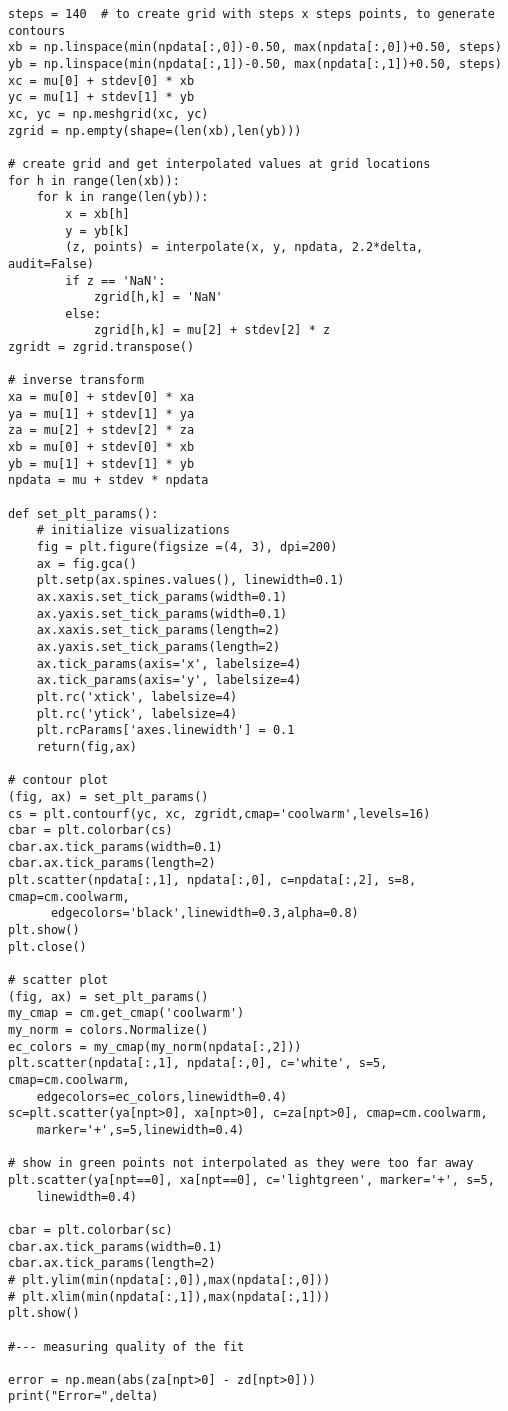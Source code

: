 \documentclass[oneside,10pt]{book}
\begin{document}
\begin{lstlisting}
steps = 140  # to create grid with steps x steps points, to generate contours
xb = np.linspace(min(npdata[:,0])-0.50, max(npdata[:,0])+0.50, steps)
yb = np.linspace(min(npdata[:,1])-0.50, max(npdata[:,1])+0.50, steps)
xc = mu[0] + stdev[0] * xb
yc = mu[1] + stdev[1] * yb
xc, yc = np.meshgrid(xc, yc)
zgrid = np.empty(shape=(len(xb),len(yb)))   

# create grid and get interpolated values at grid locations
for h in range(len(xb)):
    for k in range(len(yb)):
        x = xb[h]
        y = yb[k]
        (z, points) = interpolate(x, y, npdata, 2.2*delta, audit=False)
        if z == 'NaN':
            zgrid[h,k] = 'NaN'
        else: 
            zgrid[h,k] = mu[2] + stdev[2] * z
zgridt = zgrid.transpose()

# inverse transform
xa = mu[0] + stdev[0] * xa
ya = mu[1] + stdev[1] * ya
za = mu[2] + stdev[2] * za
xb = mu[0] + stdev[0] * xb
yb = mu[1] + stdev[1] * yb
npdata = mu + stdev * npdata

def set_plt_params():
    # initialize visualizations
    fig = plt.figure(figsize =(4, 3), dpi=200) 
    ax = fig.gca()
    plt.setp(ax.spines.values(), linewidth=0.1)
    ax.xaxis.set_tick_params(width=0.1)
    ax.yaxis.set_tick_params(width=0.1)
    ax.xaxis.set_tick_params(length=2)
    ax.yaxis.set_tick_params(length=2)
    ax.tick_params(axis='x', labelsize=4)
    ax.tick_params(axis='y', labelsize=4)
    plt.rc('xtick', labelsize=4) 
    plt.rc('ytick', labelsize=4) 
    plt.rcParams['axes.linewidth'] = 0.1
    return(fig,ax)

# contour plot
(fig, ax) = set_plt_params() 
cs = plt.contourf(yc, xc, zgridt,cmap='coolwarm',levels=16) 
cbar = plt.colorbar(cs)
cbar.ax.tick_params(width=0.1) 
cbar.ax.tick_params(length=2) 
plt.scatter(npdata[:,1], npdata[:,0], c=npdata[:,2], s=8, cmap=cm.coolwarm,
      edgecolors='black',linewidth=0.3,alpha=0.8)
plt.show()
plt.close()
           
# scatter plot        
(fig, ax) = set_plt_params()
my_cmap = cm.get_cmap('coolwarm')
my_norm = colors.Normalize()
ec_colors = my_cmap(my_norm(npdata[:,2]))
plt.scatter(npdata[:,1], npdata[:,0], c='white', s=5, cmap=cm.coolwarm,
    edgecolors=ec_colors,linewidth=0.4)
sc=plt.scatter(ya[npt>0], xa[npt>0], c=za[npt>0], cmap=cm.coolwarm, 
    marker='+',s=5,linewidth=0.4) 

# show in green points not interpolated as they were too far away
plt.scatter(ya[npt==0], xa[npt==0], c='lightgreen', marker='+', s=5, 
    linewidth=0.4) 

cbar = plt.colorbar(sc)
cbar.ax.tick_params(width=0.1) 
cbar.ax.tick_params(length=2)
# plt.ylim(min(npdata[:,0]),max(npdata[:,0]))
# plt.xlim(min(npdata[:,1]),max(npdata[:,1]))
plt.show()

#--- measuring quality of the fit

error = np.mean(abs(za[npt>0] - zd[npt>0]))
print("Error=",delta)
\end{lstlisting}
\end{document}
